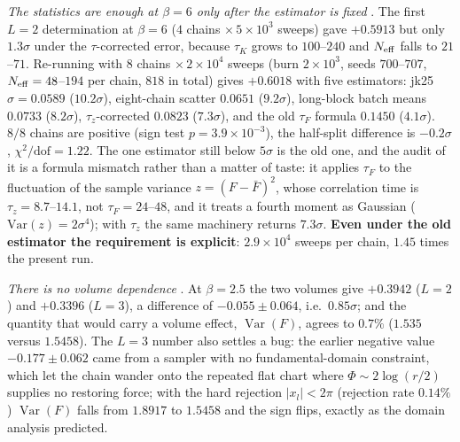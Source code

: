 \emph{The statistics are enough at $\beta=6$ only after the estimator is fixed} \LE. The first
$L=2$ determination at $\beta=6$ ($4$ chains $\times\,5\times10^{3}$ sweeps) gave $+0.5913$ but only
$1.3\sigma$ under the $\tau$-corrected error, because $\tau_{K}$ grows to $100$--$240$ and $N_{\rm
eff}$ falls to $21$--$71$. Re-running with $8$ chains $\times\,2\times10^{4}$ sweeps (burn
$2\times10^{3}$, seeds $700$--$707$, $N_{\rm eff}=48$--$194$ per chain, $818$ in total) gives
$+0.6018$ with five estimators:
jk25 $\sigma=0.0589$ ($10.2\sigma$), eight-chain scatter $0.0651$ ($9.2\sigma$), long-block
batch means $0.0733$ ($8.2\sigma$), $\tau_{z}$-corrected $0.0823$ ($7.3\sigma$), and the old
$\tau_{F}$ formula $0.1450$ ($4.1\sigma$). $8/8$ chains are positive (sign test $p=3.9\times10^{-3}$),
the half-split difference is $-0.2\sigma$, $\chi^{2}/\mathrm{dof}=1.22$. The one estimator still below
$5\sigma$ is the old one, and the audit of it is a formula mismatch rather than a matter of taste: it
applies $\tau_{F}$ to the fluctuation of the sample variance $z=(F-\bar F)^{2}$, whose correlation time
is $\tau_{z}=8.7$--$14.1$, not $\tau_{F}=24$--$48$, and it treats a fourth moment as Gaussian
($\mathrm{Var}(z)=2\sigma^{4}$); with $\tau_{z}$ the same machinery returns $7.3\sigma$. \textbf{Even
under the old estimator the requirement is explicit}: $2.9\times10^{4}$ sweeps per chain, $1.45$ times
the present run.

\emph{There is no volume dependence} \LE. At $\beta=2.5$ the two volumes give $+0.3942$ ($L=2$) and
$+0.3396$ ($L=3$), a difference of $-0.055\pm0.064$, i.e.\ $0.85\sigma$; and the quantity that would
carry a volume effect, $\operatorname{Var}(F)$, agrees to $0.7\%$ ($1.535$ versus $1.5458$). The $L=3$
number also settles a bug: the earlier negative value $-0.177\pm0.062$ came from a sampler with no
fundamental-domain constraint, which let the chain wander onto the repeated flat chart where
$\Phi\sim2\log(r/2)$ supplies no restoring force; with the hard rejection $|x_{l}|<2\pi$ (rejection
rate $0.14\%$) $\operatorname{Var}(F)$ falls from $1.8917$ to $1.5458$ and the sign flips, exactly as
the domain analysis predicted.


